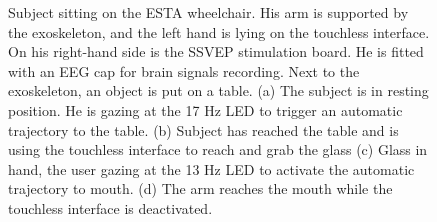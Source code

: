 \begin{figure}[h!]
\centering
{}
\caption{Subject sitting on the ESTA wheelchair. His arm is supported by the exoskeleton, and the left hand is lying on the touchless interface. On his right-hand side is the SSVEP stimulation board. He is fitted with an EEG cap for brain signals recording. Next to the exoskeleton, an object is put on a table. (a) The subject is in resting position. He is gazing at the 17 Hz LED to trigger an automatic trajectory to the table. (b) Subject has reached the table and is using the touchless interface to reach and grab the glass (c) Glass in hand, the user gazing at the 13 Hz LED to activate the automatic trajectory to mouth. (d) The arm reaches the mouth while the touchless interface is deactivated.} 
\label{fig:esta-expe}
\end{figure} 
